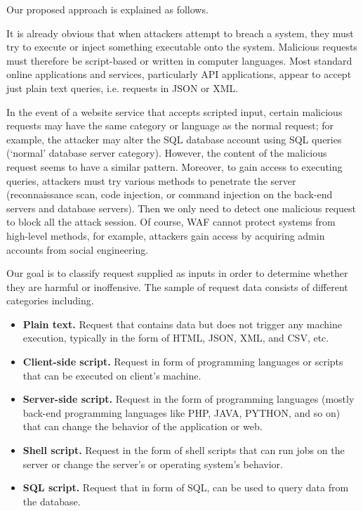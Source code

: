 Our proposed approach is explained as follows.

It is already obvious that when attackers attempt to breach a system, they must try to execute or inject something executable onto the system. Malicious requests must therefore be script-based or written in computer languages. Most standard online applications and services, particularly API applications, appear to accept just plain text queries, i.e. requests in JSON or XML. 

In the event of a website service that accepts scripted input, certain malicious requests may have the same category or language as the normal request; for example, the attacker may alter the SQL database account using SQL queries (`normal' database server category). However, the content of the malicious request seems to have a similar pattern. Moreover, to gain access to executing queries, attackers must try various methods to penetrate the server (reconnaissance scan, code injection, or command injection on the back-end servers and database servers). Then we only need to detect one malicious request to block all the attack session. Of course, WAF cannot protect systems from high-level methods, for example, attackers gain access by acquiring admin accounts from social engineering.

Our goal is to classify request supplied as inputs in order to determine whether they are harmful or inoffensive. The sample of request data consists of different categories including.
\begin{itemize}
    \item \textbf{Plain text.} Request that contains data but does not trigger any machine execution, typically in the form of HTML, JSON, XML, and CSV, etc.
    \item \textbf{Client-side script.} Request in form of programming languages or scripts that can be executed on client's machine.
    \item \textbf{Server-side script.} Request in the form of programming languages (mostly back-end programming languages like PHP, JAVA, PYTHON, and so on) that can change the behavior of the application or web.
    \item \textbf{Shell script.} Request in the form of shell scripts that can run jobs on the server or change the server's or operating system's behavior.
    \item \textbf{SQL script.} Request that in form of SQL, can be used to query data from the database.
\end{itemize}

